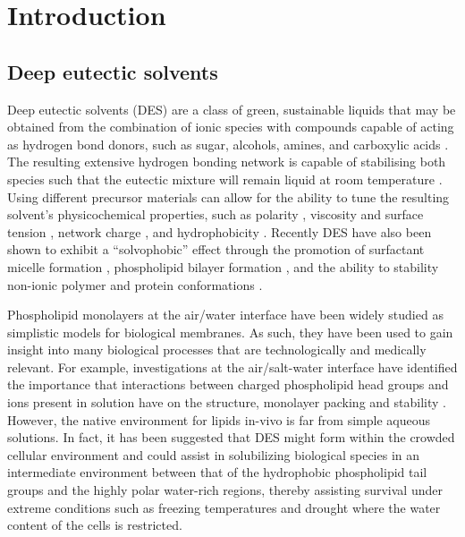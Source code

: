 \section{Introduction}
\label{sec:ref1intro}
\subsection{Deep eutectic solvents}
Deep eutectic solvents (DES) are a class of green, sustainable liquids that may be obtained from the combination of ionic species with compounds capable of acting as hydrogen bond donors, such as sugar, alcohols, amines, and carboxylic acids \cite{smith_deep_2014,dai_natural_2013}.
The resulting extensive hydrogen bonding network is capable of stabilising both species such that the eutectic mixture will remain liquid at room temperature \cite{hammond_liquid_2016,hammond_resilience_2017,araujo_inelastic_2017}.
Using different precursor materials can allow for the ability to tune the resulting solvent's physicochemical properties, such as polarity \cite{pandey_how_2014}, viscosity and surface tension \cite{smith_deep_2014}, network charge \cite{zahn_charge_2016}, and hydrophobicity \cite{ribeiro_menthol-based_2015,van_osch_hydrophobic_2015}.
Recently DES have also been shown to exhibit a ``solvophobic'' effect through the promotion of surfactant micelle formation \cite{sanchez-fernandez_micellization_2016,arnold_surfactant_2015,hsieh_micelle_2018,banjare_self-assembly_2018}, phospholipid bilayer formation \cite{bryant_spontaneous_2016,bryant_effect_2017,gutierrez_freeze-drying_2009}, and the ability to stability non-ionic polymer \cite{sapir_properties_2016} and protein conformations \cite{sanchez-fernandez_protein_2017}.

Phospholipid monolayers at the air/water interface have been widely studied as simplistic models for biological membranes.
As such, they have been used to gain insight into many biological processes that are technologically and medically relevant.
For example, investigations at the air/salt-water interface have identified the importance that interactions between charged phospholipid head groups and ions present in solution have on the structure, monolayer packing and stability \cite{mohwald_phospholipid_1990,kewalramani_effects_2010}.
However, the native environment for lipids in-vivo is far from simple aqueous solutions.
In fact, it has been suggested \cite{dai_natural_2013,hammond_resilience_2017} that DES might form within the crowded cellular environment and could assist in solubilizing biological species in an intermediate environment between that of the hydrophobic phospholipid tail groups and the highly polar water-rich regions, thereby assisting survival under extreme conditions such as freezing temperatures and drought where the water content of the cells is restricted.

